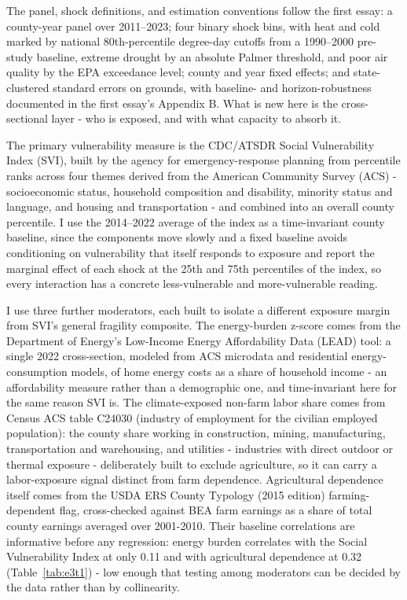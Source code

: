 \documentclass[a4paper,11pt]{article}
\begin{document}
The panel, shock definitions, and estimation conventions follow the first essay: a county-year panel over 2011--2023; four binary shock bins, with heat and cold marked by national 80th-percentile degree-day cutoffs from a 1990--2000 pre-study baseline, extreme drought by an absolute Palmer threshold, and poor air quality by the EPA exceedance level; county and year fixed effects; and state-clustered standard errors on \citet{abadie2023clustering} grounds, with baseline- and horizon-robustness documented in the first essay's Appendix B. What is new here is the cross-sectional layer - who is exposed, and with what capacity to absorb it.

The primary vulnerability measure is the CDC/ATSDR Social Vulnerability Index (SVI), built by the agency for emergency-response planning from percentile ranks across four themes derived from the American Community Survey (ACS) - socioeconomic status, household composition and disability, minority status and language, and housing and transportation - and combined into an overall county percentile. \citep{flanagan2011svi} I use the 2014--2022 average of the index as a time-invariant county baseline, since the components move slowly and a fixed baseline avoids conditioning on vulnerability that itself responds to exposure and report the marginal effect of each shock at the 25th and 75th percentiles of the index, so every interaction has a concrete less-vulnerable and more-vulnerable reading.

I use three further moderators, each built to isolate a different exposure margin from SVI's general fragility composite. The energy-burden z-score comes from the Department of Energy's Low-Income Energy Affordability Data (LEAD) tool: a single 2022 cross-section, modeled from ACS microdata and residential energy-consumption models, of home energy costs as a share of household income - an affordability measure rather than a demographic one, and time-invariant here for the same reason SVI is. The climate-exposed non-farm labor share comes from Census ACS table C24030 (industry of employment for the civilian employed population): the county share working in construction, mining, manufacturing, transportation and warehousing, and utilities - industries with direct outdoor or thermal exposure - deliberately built to exclude agriculture, so it can carry a labor-exposure signal distinct from farm dependence. Agricultural dependence itself comes from the USDA ERS County Typology (2015 edition) farming-dependent flag, cross-checked against BEA farm earnings as a share of total county earnings averaged over 2001-2010. Their baseline correlations are informative before any regression: energy burden correlates with the Social Vulnerability Index at only 0.11 and with agricultural dependence at 0.32 (Table~\ref{tab:e3t1}) - low enough that testing among moderators can be decided by the data rather than by collinearity.
\end{document}
